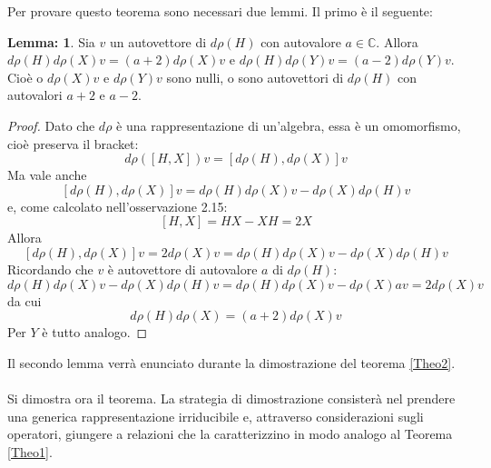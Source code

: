 \documentclass[12pt,a4paper]{report}
\theoremstyle{definition}
\theoremstyle{Theorem}
\theoremstyle{definition}
\theoremstyle{definition}
\newtheorem{Lem}[Def]{Lemma:}
\theoremstyle{definition}
\begin{document}
Per provare questo teorema sono necessari due lemmi. Il primo  è il seguente:
\begin{Lem}\label{Lemma1}
	Sia $v$ un autovettore di $d\rho(H)$ con autovalore $a\in\mathbb{C}$. Allora $d\rho(H)d\rho(X)v=(a+2)d\rho(X)v$ e $d\rho(H)d\rho(Y)v=(a-2)d\rho(Y)v$. Cioè o $d\rho(X)v$ e $d\rho(Y)v$ sono nulli, o sono autovettori di $d\rho(H)$ con autovalori $a+2$ e $a-2$.
\end{Lem}
\begin{proof}
	Dato che $d\rho$ è una rappresentazione di un'algebra, essa è un omomorfismo, cioè preserva il bracket:\\ $$d\rho([H,X])v=[d\rho(H),d\rho(X)]v$$
	Ma vale anche $$[d\rho(H),d\rho(X)]v=d\rho(H)d\rho(X)v-d\rho(X)d\rho(H)v$$ e, come calcolato nell'osservazione 2.15: $$[H,X]=HX-XH=2X$$ 
	Allora $$[d\rho(H),d\rho(X)]v=2d\rho(X)v=d\rho(H)d\rho(X)v-d\rho(X)d\rho(H)v$$ 
	Ricordando che $v$ è autovettore di autovalore $a$ di $d\rho(H)$:
	$$d\rho(H)d\rho(X)v-d\rho(X)d\rho(H)v=d\rho(H)d\rho(X)v-d\rho(X)av=2d\rho(X)v$$ da cui
	$$d\rho(H)d\rho(X)=(a+2)d\rho(X)v$$ 
	Per $Y$ è tutto analogo.
\end{proof}
Il secondo lemma verrà enunciato durante la dimostrazione del teorema \ref{Theo2}.\\\\
Si dimostra ora il teorema. La strategia di dimostrazione consisterà nel prendere una generica rappresentazione irriducibile e, attraverso considerazioni sugli operatori, giungere a relazioni che la caratterizzino in modo analogo al Teorema \ref{Theo1}.
\end{document}
